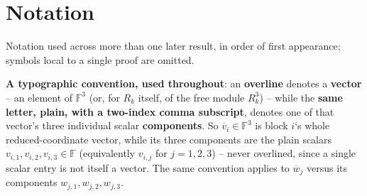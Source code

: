 \documentclass[a4paper,11pt]{scrartcl}
\begin{document}
\section{Notation}

Notation used across more than one later result, in order of first appearance; symbols local to a single proof are omitted.

\textbf{A typographic convention, used throughout}: an \textbf{overline} denotes a \textbf{vector} -- an element of \(\mathbb{F}^{3}\) (or, for \(R_{k}\) itself, of the free module \(R_{k}^{3}\)) -- while the \textbf{same letter, plain, with a two-index comma subscript}, denotes one of that vector's three individual scalar \textbf{components}. So \({\overline{v}}_{i} \in \mathbb{F}^{3}\) is block \(i\)`s whole reduced-coordinate vector, while its three components are the plain scalars \(v_{i,1},v_{i,2},v_{i,3} \in \mathbb{F}\) (equivalently \(v_{i,j}\) for \(j = 1,2,3\)) -- never overlined, since a single scalar entry is not itself a vector. The same convention applies to \({\overline{w}}_{j}\) versus its components \(w_{j,1},w_{j,2},w_{j,3}\).
\end{document}
